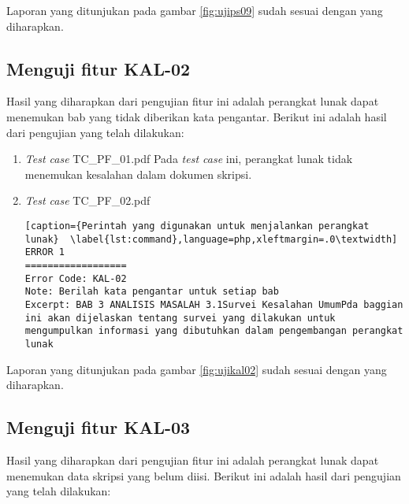Laporan yang ditunjukan pada gambar \ref{fig:ujips09} sudah sesuai dengan yang diharapkan.

\subsection{Menguji fitur KAL-02}
Hasil yang diharapkan dari pengujian fitur ini adalah perangkat lunak dapat menemukan bab yang tidak diberikan kata pengantar. Berikut ini adalah hasil dari pengujian yang telah dilakukan:

\begin{enumerate}
	\item \textit{Test case} TC\_PF\_01.pdf
	Pada \textit{test case} ini, perangkat lunak tidak menemukan kesalahan dalam dokumen skripsi.
	
	\item \textit{Test case} TC\_PF\_02.pdf
	
\begin{lstlisting}[caption={Perintah yang digunakan untuk menjalankan perangkat lunak}	\label{lst:command},language=php,xleftmargin=.0\textwidth]
ERROR 1
==================
Error Code: KAL-02
Note: Berilah kata pengantar untuk setiap bab
Excerpt: BAB 3 ANALISIS MASALAH 3.1Survei Kesalahan UmumPda baggian ini akan dijelaskan tentang survei yang dilakukan untuk mengumpulkan informasi yang dibutuhkan dalam pengembangan perangkat lunak
\end{lstlisting}
\end{enumerate}

Laporan yang ditunjukan pada gambar \ref{fig:ujikal02} sudah sesuai dengan yang diharapkan.

\subsection{Menguji fitur KAL-03}
Hasil yang diharapkan dari pengujian fitur ini adalah perangkat lunak dapat menemukan data skripsi yang belum diisi. Berikut ini adalah hasil dari pengujian yang telah dilakukan:

